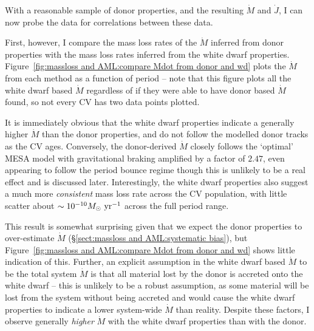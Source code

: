 \label{chpt:discussion} %

With a reasonable sample of donor properties, and the resulting $\dot M$ and $\dot J$, I can now probe the data for correlations between these data.

First, however, I compare the mass loss rates of the $\dot M$ inferred from donor properties with the mass loss rates inferred from the white dwarf properties.
Figure~\ref{fig:massloss and AML:compare Mdot from donor and wd} plots the $\dot M$ from each method as a function of period -- note that this figure plots all the white dwarf based $\dot M$ regardless of if they were able to have donor based $\dot M$ found, so not every CV has two data points plotted.

It is immediately obvious that the white dwarf properties indicate a generally higher $\dot M$ than the donor properties, and do not follow the modelled donor tracks as the CV ages.
Conversely, the donor-derived $\dot M$ closely follows the `optimal' MESA model with gravitational braking amplified by a factor of $2.47$, even appearing to follow the period bounce regime though this is unlikely to be a real effect and is discussed later.
Interestingly, the white dwarf properties also suggest a much more \textit{consistent} mass loss rate across the CV population, with little scatter about $\sim 10^{-10} M_\odot~{\rm yr}^{-1}$ across the full period range.

This result is somewhat surprising given that we expect the donor properties to over-estimate $\dot M$ (\S\ref{sect:massloss and AML:systematic bias}), but Figure~\ref{fig:massloss and AML:compare Mdot from donor and wd} shows little indication of this.
Further, an explicit assumption in the white dwarf based $\dot M$ to be the total system $\dot M$ is that all material lost by the donor is accreted onto the white dwarf -- this is unlikely to be a robust assumption, as some material will be lost from the system without being accreted and would cause the white dwarf properties to indicate a lower system-wide $\dot M$ than reality.
Despite these factors, I observe generally \textit{higher} $\dot M$ with the white dwarf properties than with the donor.

